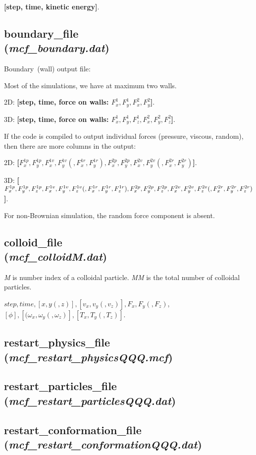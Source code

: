 \documentclass[a4paper,10pt]{article}
\begin{document}
\textbf{[step, time, kinetic energy]}.

\subsection{\textbf{boundary\_file}\\
(\textit{mcf\_boundary.dat})}
Boundary~(wall) output file:

Most of the simulations, we have at maximum two walls.


2D: \textbf{[step, time, force on walls:  $F^1_x, F^1_y, F^2_x, F^2_y$]}.

3D: \textbf{[step, time, force on walls:  $F^1_x, F^1_y, F^1_z, F^2_x, F^2_y, F^2_z$]}.

If the code is compiled to output individual forces (pressure, viscous, random),
then there are more columns in the output:

2D: \textbf{[$F^{1p}_x, F^{1p}_y, 
F^{1v}_x, F^{1v}_y
(,F^{1r}_x, F^{1r}_y),
F^{2p}_x, F^{2p}_y, 
F^{2v}_x, F^{2v}_y
(,F^{2r}_x, F^{2r}_y)$]}.

3D: \textbf{[$F^{1p}_x, F^{1p}_y, F^{1p}_z, 
F^{1v}_x, F^{1v}_y, F^{1v}_z
(,F^{1r}_x, F^{1r}_y, F^{1r}_z),\\
F^{2p}_x, F^{2p}_y, F^{2p}_z, 
F^{2v}_x, F^{2v}_y, F^{2v}_z
(,F^{2r}_x, F^{2r}_y, F^{2r}_z)$]}.

For non-Brownian simulation, the random force component is absent.

\subsection{\textbf{colloid\_file}\\
(\textit{mcf\_colloidM.dat})}
\textit{M} is number index of a colloidal particle.
\textit{MM} is the total number of colloidal particles.

\textbf{$step, time, [x, y(, z)], [v_x, v_y(, v_z)],
F_x, F_y(, F_z)$},
\textbf{$[\phi],[(\omega_x, \omega_y(, \omega_z)], 
[T_x, T_y(, T_z)]$}.

\subsection{\textbf{restart\_physics\_file}\\
(\textit{mcf\_restart\_physicsQQQ.mcf})}


\subsection{\textbf{restart\_particles\_file}\\
(\textit{mcf\_restart\_particlesQQQ.dat})}


\subsection{\textbf{restart\_conformation\_file}\\
(\textit{mcf\_restart\_conformationQQQ.dat})}



\end{document}
